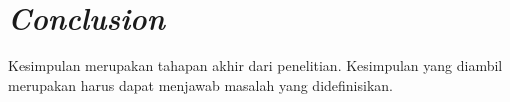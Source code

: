 \section{\textit{Conclusion}}
Kesimpulan merupakan tahapan akhir dari penelitian. Kesimpulan yang diambil merupakan harus dapat menjawab masalah yang didefinisikan.





